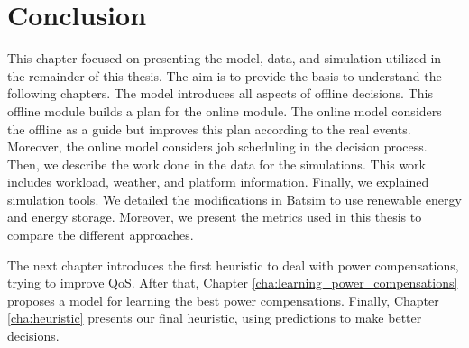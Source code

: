 \section{Conclusion}
This chapter focused on presenting the model, data, and simulation utilized in the remainder of this thesis. The aim is to provide the basis to understand the following chapters. The model introduces all aspects of offline decisions. This offline module builds a plan for the online module. The online model considers the offline as a guide but improves this plan according to the real events. Moreover, the online model considers job scheduling in the decision process. Then, we describe the work done in the data for the simulations. This work includes workload, weather, and platform information. Finally, we explained simulation tools. We detailed the modifications in Batsim to use renewable energy and energy storage. Moreover, we present the metrics used in this thesis to compare the different approaches.

The next chapter introduces the first heuristic to deal with power compensations, trying to improve QoS. After that, Chapter \ref{cha:learning_power_compensations} proposes a model for learning the best power compensations. Finally, Chapter \ref{cha:heuristic} presents our final heuristic, using predictions to make better decisions.